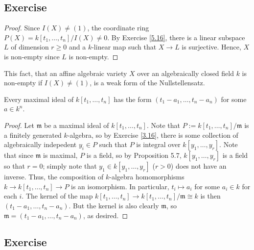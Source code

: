 \subsection{Exercise}\label{5.17}

\begin{proof}
Since $I(X) \neq (1)$, the coordinate ring $P(X) = k[t_1,\ldots,t_n]/I(X) \neq 0$. By Exercise \ref{5.16}, there is a linear subspace $L$ of
dimension $r \ge 0$ and a $k$-linear map such that $X \to L$ is surjective. Hence, $X$ is non-empty since $L$ is non-empty. 
\end{proof}

\begin{remark}
This fact, that an affine algebraic variety $X$ over an algebraically closed field $k$ is non-empty if $I(X) \neq (1)$, is a weak form of the
Nullstellensatz.
\end{remark}

Every maximal ideal of $k[t_1,\ldots,t_n]$ has the form $(t_1 - a_1, \ldots, t_n - a_n)$ for some $a \in k^n$.

\begin{proof}
Let $\mathfrak{m}$ be a maximal ideal of $k[t_1,\ldots,t_n]$. Note that $P := k[t_1,\ldots,t_n]/\mathfrak{m}$ is a finitely generated $k$-algebra,
so by Exercise \ref{3.16}, there is some collection of algebraically indepedent $y_i \in P$ such that $P$ is integral over $k[y_1,\ldots,y_r]$. Note
that since $\mathfrak{m}$ is maximal, $P$ is a field, so by Proposition 5.7, $k[y_1,\ldots,y_r]$ is a field so that $r = 0$; simply note that
$y_1 \in k[y_1,\ldots,y_r]$ ($r > 0$) does not have an inverse. Thus, the composition
of $k$-algebra homomorphisms $k \to k[t_1,\ldots,t_n] \to P$ is an isomorphism. In particular, $t_i \mapsto a_i$ for some $a_i \in k$ for each $i$. 
The kernel of the map $k[t_1,\ldots,t_n] \to k[t_1,\ldots,t_n]/\mathfrak{m} \cong k$ is then $(t_1 - a_1, \ldots, t_n - a_n)$. But the kernel is also
clearly $\mathfrak{m}$, so $\mathfrak{m} = (t_1 - a_1, \ldots, t_n - a_n)$, as desired.
\end{proof}

\subsection{Exercise}\label{5.18}

